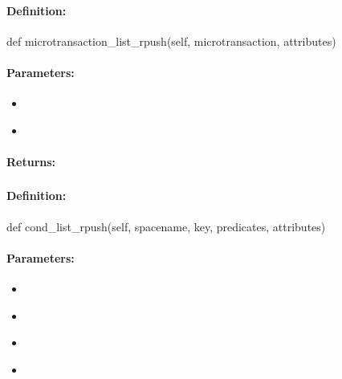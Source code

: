 \paragraph{Definition:}
\begin{pythoncode}
def microtransaction_list_rpush(self, microtransaction, attributes)
\end{pythoncode}

\paragraph{Parameters:}
\begin{itemize}[noitemsep]
\item {}\\

\item {}\\

\end{itemize}

\paragraph{Returns:}


\pagebreak
\subsubsection{}
\label{api:python:cond_list_rpush}


\paragraph{Definition:}
\begin{pythoncode}
def cond_list_rpush(self, spacename, key, predicates, attributes)
\end{pythoncode}

\paragraph{Parameters:}
\begin{itemize}[noitemsep]
\item {}\\

\item {}\\

\item {}\\

\item {}\\

\end{itemize}

